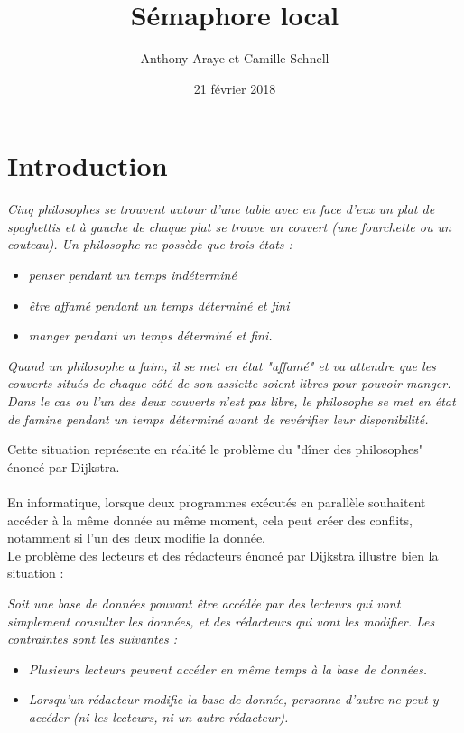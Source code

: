 \documentclass[12pt]{article}
\title{Sémaphore local}
\author{Anthony Araye et Camille Schnell}
\date{21 février 2018}
\begin{document}
\maketitle
\renewcommand{\contentsname}{Sommaire}
\tableofcontents
\newpage
\section{Introduction}
    \textit{Cinq philosophes se trouvent autour d'une table avec en face d'eux un plat de spaghettis et à gauche de chaque plat se trouve un couvert (une fourchette ou un couteau).
    Un philosophe ne possède que trois états :}
    \begin{itemize}
        \item \textit{penser pendant un temps indéterminé}
        \item \textit{être affamé pendant un temps déterminé et fini}
        \item \textit{manger pendant un temps déterminé et fini.}
    \end{itemize}

    \textit{Quand un philosophe a faim, il se met en état "affamé" et va attendre que les couverts situés de chaque côté de son assiette soient libres pour pouvoir manger.
    Dans le cas ou l'un des deux couverts n'est pas libre, le philosophe se met en état de famine pendant un temps déterminé avant de revérifier leur disponibilité.}

    Cette situation représente en réalité le problème du "dîner des philosophes" énoncé par Dijkstra. \\ \\

    En informatique, lorsque deux programmes exécutés en parallèle souhaitent accéder à la même donnée au même moment, cela peut créer des conflits, notamment si l'un des deux modifie la donnée. \\

    Le problème des lecteurs et des rédacteurs énoncé par Dijkstra illustre bien la situation :

    \textit{Soit une base de données pouvant être accédée par des lecteurs qui vont simplement consulter les données, et des rédacteurs qui vont les modifier.
    Les contraintes sont les suivantes :}
    \begin{itemize}
      \item \textit{Plusieurs lecteurs peuvent accéder en même temps à la base de données.}
      \item \textit{Lorsqu'un rédacteur modifie la base de donnée, personne d'autre ne peut y accéder (ni les lecteurs, ni un autre rédacteur).} \\
    \end{itemize}
\end{document}
